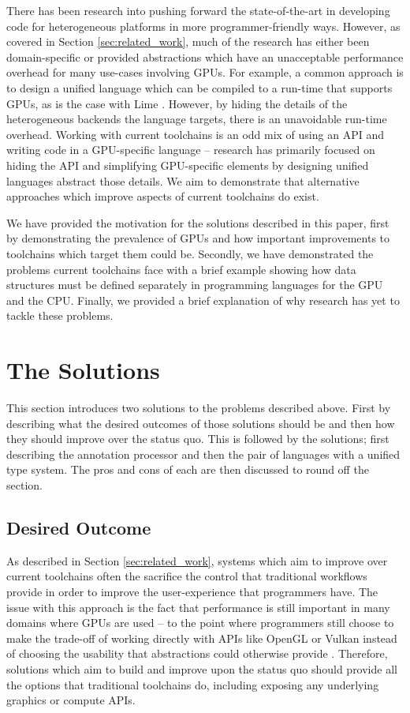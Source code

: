\documentclass[a4paper,12pt,twoside,openright]{report}
\begin{document}
There has been research into pushing forward the state-of-the-art in developing
code for heterogeneous platforms in more programmer-friendly ways. However, as
covered in Section \ref{sec:related_work}, much of the research has either been
domain-specific or provided abstractions which have an unacceptable performance
overhead for many use-cases involving GPUs. For example, a common approach is
to design a unified language which can be compiled to a run-time that supports
GPUs, as is the case with Lime \cite{Lime2010}. However, by hiding the details
of the heterogeneous backends the language targets, there is an unavoidable
run-time overhead. Working with current toolchains is an odd mix of using an
API and writing code in a GPU-specific language -- research has primarily
focused on hiding the API and simplifying GPU-specific elements by designing
unified languages abstract those details. We aim to demonstrate that
alternative approaches which improve aspects of current toolchains do exist.

We have provided the motivation for the solutions described in this paper,
first by demonstrating the prevalence of GPUs and how important improvements to
toolchains which target them could be. Secondly, we have demonstrated the
problems current toolchains face with a brief example showing how data
structures must be defined separately in programming languages for the GPU and
the CPU. Finally, we provided a brief explanation of why research has yet to
tackle these problems.

\section{The Solutions}

\label{sec:solutions_introduction}

This section introduces two solutions to the problems described above. First by
describing what the desired outcomes of those solutions should be and then how
they should improve over the status quo. This is followed by the solutions;
first describing the annotation processor and then the pair of languages with a
unified type system. The pros and cons of each are then discussed to round off
the section.

\subsection{Desired Outcome}

As described in Section \ref{sec:related_work}, systems which aim to improve
over current toolchains often the sacrifice the control that traditional
workflows provide in order to improve the user-experience that programmers
have. The issue with this approach is the fact that performance is still
important in many domains where GPUs are used -- to the point where programmers
still choose to make the trade-off of working directly with APIs like OpenGL or
Vulkan instead of choosing the usability that abstractions could otherwise
provide \cite{TODO}. Therefore, solutions which aim to build and improve upon
the status quo should provide all the options that traditional toolchains do,
including exposing any underlying graphics or compute APIs.
\end{document}
